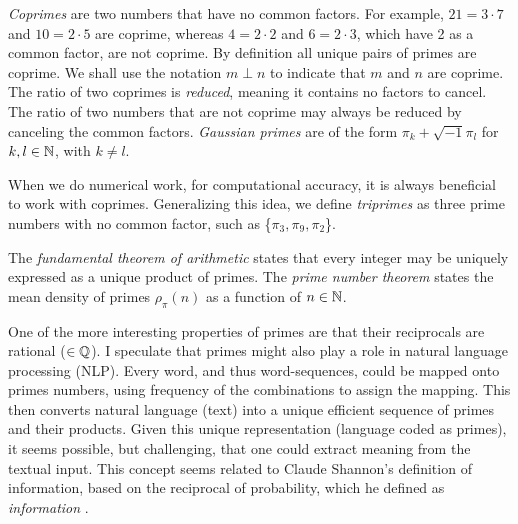 \documentclass{ximera}
\begin{document}
  
\emph{Coprimes} are two numbers that have no common factors. 
For example, $21=3\cdot 7$ and $10 = 2 \cdot 5$ are coprime, whereas $4=2\cdot2$ and $6=2\cdot 3$,
which have 2 as a common factor, are not coprime.  By definition all unique pairs of primes are coprime. 
We shall use the notation $m \perp n$ to indicate that $m$ and $n$ are coprime. The ratio of two coprimes
is \emph{reduced}, meaning it contains no factors to cancel.
The ratio of two numbers that are not coprime may always be reduced by canceling the common factors.
\emph{Gaussian primes} are of the form $\pi_k + \sqrt{-1}\pi_l$ for $k, l\in \mathbb{N}$, with $k \ne l$.
%



When we do numerical work, for computational accuracy, it is always beneficial to work with coprimes.
Generalizing this idea, we define \emph{triprimes} as three prime numbers with no common factor,
such as \{$\pi_3, \pi_9, \pi_2$\}.

The \emph{fundamental theorem of arithmetic} states that every integer may be uniquely expressed as a unique product
of primes.  The \emph{prime number theorem} states the mean density of primes $\rho_\pi(n)$ as a function of $n\in\mathbb{N}$.

One of the more interesting properties of primes are that their reciprocals are rational ($\in\mathbb{Q}$).
 {\magenta
 I speculate that primes might also play a role in natural language processing (NLP).
 Every word, and thus word-sequences, could be mapped onto primes numbers, using frequency of the combinations to assign the mapping. This then converts natural language (text) into a unique efficient sequence of primes and their products. 
Given this unique representation (language coded as primes), it seems possible, but challenging,
that one could extract meaning from the textual input.
This concept seems related to Claude Shannon's definition of information, based on the reciprocal of probability, which he defined as \emph{information} \citep{Allen94a}.
	}
	
\end{document}
